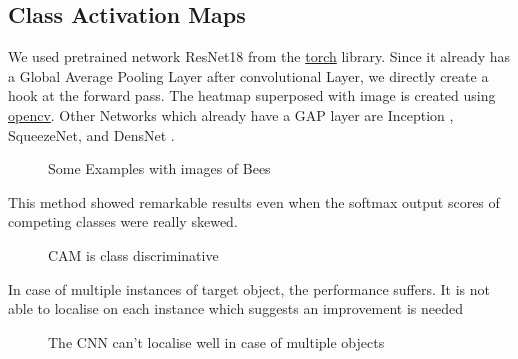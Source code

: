\subsection{Class Activation Maps}
We used pretrained network ResNet18 \cite{ResNet} from the \href{https://pytorch.org/}{torch} library. 
Since it already has a Global Average Pooling Layer after convolutional Layer, we directly create a hook at the forward pass. The heatmap superposed with image is created using \href{https://opencv.org/}{opencv}.
Other Networks which already have a GAP layer are Inception \cite{Inception}, SqueezeNet\cite{SqueezeNet}, and DensNet \cite{DensNet}.\\

\begin{figure}[H]
    \centering
    \qquad
    \caption[Short text]{Some Examples with images of Bees}
    \label{fig:Some_Examples}
\end{figure}
This method showed remarkable results even when the softmax output scores of competing classes were really skewed. \\

\begin{figure}[H]
    \centering
    \qquad
    \qquad
    \qquad
    \caption[Short text]{CAM is class discriminative}
    \label{fig:Defi}
\end{figure}

In case of multiple instances of target object, the performance suffers. It is not able to localise on each instance which suggests an improvement is needed

\begin{figure}[H]
    \centering
    \qquad
    \caption[Short text]{The CNN can't localise well in case of multiple objects}
    \label{fig:Defi}
\end{figure}


